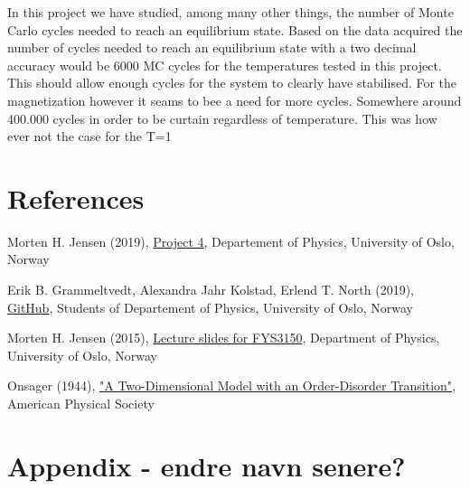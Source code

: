 \documentclass{article}
\begin{document}
In this project we have studied, among many other things, the number of Monte Carlo cycles needed to reach an equilibrium state. Based on the data acquired the number of cycles needed to reach an equilibrium state with a two decimal accuracy would be 6000 MC cycles for the temperatures tested in this project. This should allow enough cycles for the system to clearly have stabilised. For the magnetization however it seams to bee a need for more cycles. Somewhere around 400.000 cycles in order to be curtain regardless of temperature. This was how ever not the case for the T=1



\vspace{1cm}

\section{References} \label{sec:References}

\begin{thebibliography}{}

Morten H. Jensen (2019), \href{https://github.com/CompPhysics/ComputationalPhysics/blob/master/doc/Projects/2019/Project4/pdf/Project4.pdf}{Project 4}, Departement of Physics, University of Oslo, Norway

Erik B. Grammeltvedt, Alexandra Jahr Kolstad, Erlend T. North (2019), \href{https://github.com/Erikbgram/Fys3150}{GitHub}, Students of Departement of Physics, University of Oslo, Norway

Morten H. Jensen (2015), \href{https://github.com/CompPhysics/ComputationalPhysics/blob/master/doc/Lectures/lectures2015.pdf}{Lecture slides for FYS3150}, Department of Physics, University of Oslo, Norway

Onsager (1944), \href{https://journals.aps.org/pr/abstract/10.1103/PhysRev.65.117}{"A Two-Dimensional Model with an Order-Disorder Transition"}, American Physical Society


\end{thebibliography}


\vspace{1cm}


\appendix
\section{Appendix - endre navn senere?} \label{sec:Appendix}
\end{document}
